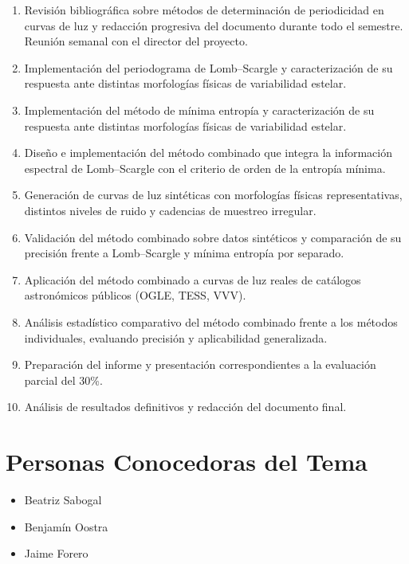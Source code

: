 \documentclass[letterpaper,12pt]{extarticle}
\begin{document}
\begin{enumerate}
    \item Revisión bibliográfica sobre métodos de determinación de periodicidad en curvas de luz y redacción progresiva del documento durante todo el semestre. Reunión semanal con el director del proyecto.
    \item Implementación del periodograma de Lomb--Scargle y caracterización de su respuesta ante distintas morfologías físicas de variabilidad estelar.
    \item Implementación del método de mínima entropía y caracterización de su respuesta ante distintas morfologías físicas de variabilidad estelar.
    \item Diseño e implementación del método combinado que integra la información espectral de Lomb--Scargle con el criterio de orden de la entropía mínima.
    \item Generación de curvas de luz sintéticas con morfologías físicas representativas, distintos niveles de ruido y cadencias de muestreo irregular.
    \item Validación del método combinado sobre datos sintéticos y comparación de su precisión frente a Lomb--Scargle y mínima entropía por separado.
    \item Aplicación del método combinado a curvas de luz reales de catálogos astronómicos públicos (OGLE, TESS, VVV).
    \item Análisis estadístico comparativo del método combinado frente a los métodos individuales, evaluando precisión y aplicabilidad generalizada.
    \item Preparación del informe y presentación correspondientes a la evaluación parcial del 30\%.
    \item Análisis de resultados definitivos y redacción del documento final.
\end{enumerate}

\section{Personas Conocedoras del Tema}

\begin{itemize}
        \item Beatriz Sabogal
        
        \item Benjamín Oostra
        
        \item Jaime Forero
\end{itemize}
\end{document}
